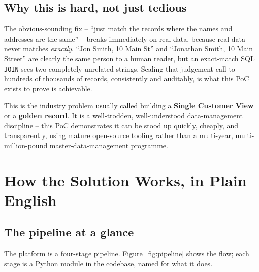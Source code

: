 \documentclass[11pt]{report}
\newcommand{\code}[1]{\lstinline[style=plain]!#1!}
\begin{document}
\section{Why this is hard, not just tedious}

The obvious-sounding fix -- ``just match the records where the names and addresses are the same'' -- breaks immediately on real data, because real data never matches \emph{exactly}. ``Jon Smith, 10 Main St'' and ``Jonathan Smith, 10 Main Street'' are clearly the same person to a human reader, but an exact-match SQL \code{JOIN} sees two completely unrelated strings. Scaling that judgement call to hundreds of thousands of records, consistently and auditably, is what this PoC exists to prove is achievable.

\begin{bizbox}
This is the industry problem usually called building a \textbf{Single Customer View} or a \textbf{golden record}. It is a well-trodden, well-understood data-management discipline -- this PoC demonstrates it can be stood up quickly, cheaply, and transparently, using mature open-source tooling rather than a multi-year, multi-million-pound master-data-management programme.
\end{bizbox}

\chapter{How the Solution Works, in Plain English}

\section{The pipeline at a glance}

The platform is a four-stage pipeline. Figure~\ref{fig:pipeline} shows the flow; each stage is a Python module in the codebase, named for what it does.
\end{document}
